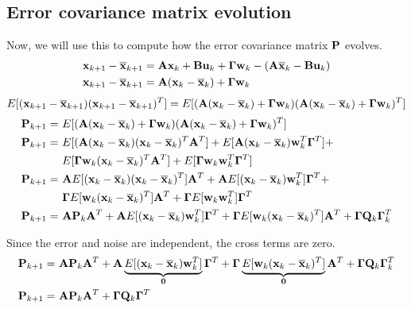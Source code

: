 \subsection{Error covariance matrix evolution}

Now, we will use this to compute how the \gls{error} covariance matrix $\mathbf{P}$
evolves.
\begin{align*}
  \mathbf{x}_{k+1} - \overline{\mathbf{x}}_{k+1} &= \mathbf{A}\mathbf{x}_k +
    \mathbf{B}\mathbf{u}_k + \mathbf{\Gamma}\mathbf{w}_k - (\mathbf{A}\overline{\mathbf{x}}_k -
    \mathbf{B}\mathbf{u}_k) \\
  \mathbf{x}_{k+1} - \overline{\mathbf{x}}_{k+1} &=
    \mathbf{A}(\mathbf{x}_k - \overline{\mathbf{x}}_k) + \mathbf{\Gamma}\mathbf{w}_k
\end{align*}
\begin{equation*}
  E[(\mathbf{x}_{k+1} - \overline{\mathbf{x}}_{k+1})(\mathbf{x}_{k+1} - \overline{\mathbf{x}}_{k+1})^T] =
    E[(\mathbf{A}(\mathbf{x}_k - \overline{\mathbf{x}}_k) + \mathbf{\Gamma}\mathbf{w}_k)
      (\mathbf{A}(\mathbf{x}_k - \overline{\mathbf{x}}_k) + \mathbf{\Gamma}\mathbf{w}_k)^T]
\end{equation*}
\begin{align*}
  \mathbf{P}_{k+1} =~&
    E[(\mathbf{A}(\mathbf{x}_k - \overline{\mathbf{x}}_k) + \mathbf{\Gamma}\mathbf{w}_k)
      (\mathbf{A}(\mathbf{x}_k - \overline{\mathbf{x}}_k) + \mathbf{\Gamma}\mathbf{w}_k)^T] \\
  \mathbf{P}_{k+1} =~&
    E[(\mathbf{A}(\mathbf{x}_k - \overline{\mathbf{x}}_k)(\mathbf{x}_k - \overline{\mathbf{x}}_k)^T
      \mathbf{A}^T] +
    E[\mathbf{A}(\mathbf{x}_k - \overline{\mathbf{x}}_k)\mathbf{w}_k^T\mathbf{\Gamma}^T] + \\
    &E[\mathbf{\Gamma}\mathbf{w}_k(\mathbf{x}_k - \overline{\mathbf{x}}_k)^T\mathbf{A}^T] +
    E[\mathbf{\Gamma}\mathbf{w}_k\mathbf{w}_k^T\mathbf{\Gamma}^T] \\
  \mathbf{P}_{k+1} =~&
    \mathbf{A}E[(\mathbf{x}_k - \overline{\mathbf{x}}_k)(\mathbf{x}_k - \overline{\mathbf{x}}_k)^T]
    \mathbf{A}^T +
    \mathbf{A}E[(\mathbf{x}_k - \overline{\mathbf{x}}_k)\mathbf{w}_k^T]\mathbf{\Gamma}^T + \\
    &\mathbf{\Gamma} E[\mathbf{w}_k(\mathbf{x}_k - \overline{\mathbf{x}}_k)^T]\mathbf{A}^T +
    \mathbf{\Gamma} E[\mathbf{w}_k\mathbf{w}_k^T]\mathbf{\Gamma}^T \\
  \mathbf{P}_{k+1} =~& \mathbf{A}\mathbf{P}_k\mathbf{A}^T +
    \mathbf{A}E[(\mathbf{x}_k - \overline{\mathbf{x}}_k)\mathbf{w}_k^T]\mathbf{\Gamma}^T +
    \mathbf{\Gamma} E[\mathbf{w}_k(\mathbf{x}_k - \overline{\mathbf{x}}_k)^T]\mathbf{A}^T +
    \mathbf{\Gamma}\mathbf{Q}_k\mathbf{\Gamma}_k^T
\end{align*}

Since the error and noise are independent, the cross terms are zero.
\begin{align*}
  \mathbf{P}_{k+1} =~& \mathbf{A}\mathbf{P}_k\mathbf{A}^T +
    \mathbf{A}\underbrace{
      E[(\mathbf{x}_k - \overline{\mathbf{x}}_k)\mathbf{w}_k^T]}_{\mathbf{0}}\mathbf{\Gamma}^T +
    \mathbf{\Gamma}\underbrace{
      E[\mathbf{w}_k(\mathbf{x}_k - \overline{\mathbf{x}}_k)^T]}_{\mathbf{0}}\mathbf{A}^T +
    \mathbf{\Gamma}\mathbf{Q}_k\mathbf{\Gamma}_k^T \\
  \mathbf{P}_{k+1} =~& \mathbf{A}\mathbf{P}_k\mathbf{A}^T +
    \mathbf{\Gamma}\mathbf{Q}_k\mathbf{\Gamma}^T
\end{align*}

